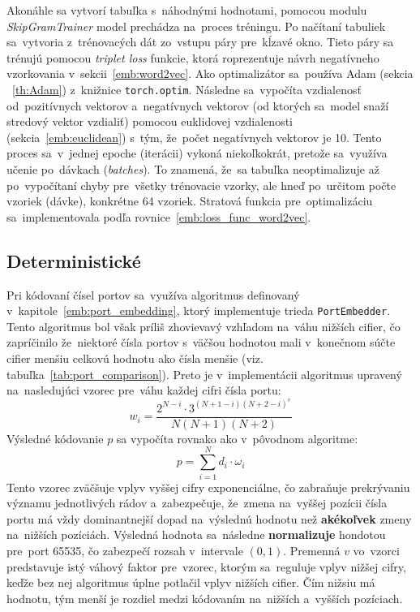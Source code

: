 Akonáhle sa vytvorí tabuľka s~náhodnými hodnotami, pomocou modulu \textit{SkipGramTrainer} model prechádza na~proces tréningu. Po načítaní tabuliek sa~vytvoria z~trénovacých dát zo~vstupu páry pre~kĺzavé okno. Tieto páry sa trénujú pomocou \textit{triplet loss} funkcie, ktorá roprezentuje návrh negatívneho vzorkovania v~sekcii~\ref{emb:word2vec}. Ako optimalizátor sa~používa Adam (sekcia ~\ref{th:Adam}) z~knižnice \texttt{torch.optim}. Následne sa~vypočíta vzdialenosť od~pozitívnych vektorov a~negatívnych vektorov (od ktorých sa~model snaží stredový vektor vzdialiť) pomocou euklidovej vzdialenosti (sekcia~\ref{emb:euclidean}) s~tým, že~počet negatívnych vektorov je 10. Tento proces sa~v~jednej epoche (iterácii) vykoná niekoľkokrát, pretože sa~využíva učenie po~dávkach (\textit{batches}). To znamená, že~sa tabuľka neoptimalizuje až po~vypočítaní chyby pre~všetky trénovacie vzorky, ale hneď po~určitom počte vzoriek (dávke), konkrétne 64 vzoriek. Stratová funkcia pre~optimalizáciu sa~implementovala podľa rovnice~\ref{emb:loss_func_word2vec}.

\subsection{Deterministické}
Pri kódovaní čísel portov sa~využíva algoritmus definovaný v~kapitole~\ref{emb:port_embedding}, ktorý implementuje trieda \texttt{PortEmbedder}. Tento algoritmus bol však príliš zhovievavý vzhľadom na~váhu nižších cifier, čo zapríčinilo že~niektoré čísla portov s~väčšou hodnotou mali v~konečnom súčte cifier menšiu celkovú hodnotu ako čísla menšie (viz. tabuľka~\ref{tab:port_comparison}). Preto je v~implementácii algoritmus upravený na~nasledujúci vzorec pre~váhu každej cifri čísla portu:
\begin{equation}
    w_i = \frac{2^{N - i} \cdot 3^{(N + 1 - i)(N + 2 - i)^{v}}}{N(N + 1)(N + 2)}
\end{equation}
Výsledné kódovanie $p$ sa vypočíta rovnako ako v~pôvodnom algoritme:
\begin{equation}
    p = \sum_{i=1}^N{d_i \cdot \omega_i}
\end{equation}
Tento vzorec zväčšuje vplyv vyššej cifry exponenciálne, čo zabraňuje prekrývaniu významu jednotlivých rádov a~zabezpečuje, že~zmena na~vyššej pozícii čísla portu má vždy dominantnejší dopad na~výslednú hodnotu než \textbf{akékoľvek} zmeny na~nižších pozíciách. Výsledná hodnota sa~následne \textbf{normalizuje} hondotou pre~port 65535, čo zabezpečí rozsah v~intervale $(0,1)$. Premenná $v$ vo~vzorci predstavuje istý váhový faktor pre~vzorec, ktorým sa~reguluje vplyv nižšej cifry, keďže bez nej algoritmus úplne potlačil vplyv nižších cifier. Čím nižsiu má hodnotu, tým menší je rozdiel medzi kódovaním na~nižších a~vyšších pozíciach.

